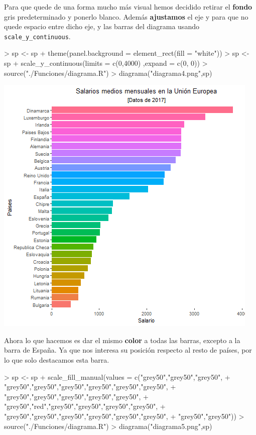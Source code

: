\documentclass [a4paper] {article}
\begin{document}
\bigskip
Para que quede de una forma mucho más visual hemos decidido retirar el \textbf{fondo} gris predeterminado y ponerlo blanco.
Además \textbf{ajustamos} el eje y para que no quede espacio entre dicho eje, y las barras del diagrama usando
\texttt{scale\_y\_continuous}.
\begin{Schunk}
\begin{Sinput}
> sp <- sp + theme(panel.background = element_rect(fill = "white"))
> sp <- sp + scale_y_continuous(limits = c(0,4000) ,expand = c(0, 0))
> source("./Funciones/diagrama.R")
> diagrama("diagrama4.png",sp)
\end{Sinput}
\end{Schunk}

\includegraphics[width=\textwidth]{diagrama4}

\bigskip
Ahora lo que hacemos es dar el mismo \textbf{color} a todas las barras, excepto a la barra de España. Ya que nos interesa
su posición respecto al resto de países, por lo que solo destacamos esta barra.
\begin{Schunk}
\begin{Sinput}
> sp <- sp + scale_fill_manual(values = c("grey50","grey50","grey50",
+         "grey50","grey50","grey50","grey50","grey50","grey50",
+         "grey50","grey50","grey50","grey50","grey50",
+         "grey50","red","grey50","grey50","grey50","grey50",
+         "grey50","grey50","grey50","grey50","grey50","grey50",
+         "grey50","grey50"))
> source("./Funciones/diagrama.R")
> diagrama("diagrama5.png",sp)
\end{Sinput}
\end{Schunk}
\end{document}
